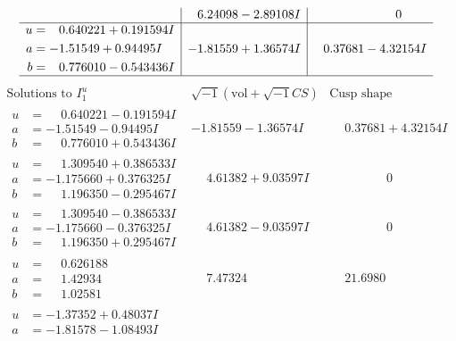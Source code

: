 \documentclass[1p]{elsarticle_modified}
\theoremstyle{definition}
\newcommand{\I}{\sqrt{-1}}
\begin{document}
$$\begin{array}{c|c|c}
 & \phantom{-}6.24098 - 2.89108 I & \phantom{-0.000000 } 0 \\ \hline\begin{aligned}
u &= \phantom{-}0.640221 + 0.191594 I \\
a &= -1.51549 + 0.94495 I \\
b &= \phantom{-}0.776010 - 0.543436 I\end{aligned}
 & -1.81559 + 1.36574 I & \phantom{-}0.37681 - 4.32154 I\\
 \hline 
 \end{array}$$\newpage$$\begin{array}{c|c|c}  
\text{Solutions to }I^u_{1}& \I (\text{vol} + \sqrt{-1}CS) & \text{Cusp shape}\\
 \hline 
\begin{aligned}
u &= \phantom{-}0.640221 - 0.191594 I \\
a &= -1.51549 - 0.94495 I \\
b &= \phantom{-}0.776010 + 0.543436 I\end{aligned}
 & -1.81559 - 1.36574 I & \phantom{-}0.37681 + 4.32154 I \\ \hline\begin{aligned}
u &= \phantom{-}1.309540 + 0.386533 I \\
a &= -1.175660 + 0.376325 I \\
b &= \phantom{-}1.196350 - 0.295467 I\end{aligned}
 & \phantom{-}4.61382 + 9.03597 I & \phantom{-0.000000 } 0 \\ \hline\begin{aligned}
u &= \phantom{-}1.309540 - 0.386533 I \\
a &= -1.175660 - 0.376325 I \\
b &= \phantom{-}1.196350 + 0.295467 I\end{aligned}
 & \phantom{-}4.61382 - 9.03597 I & \phantom{-0.000000 } 0 \\ \hline\begin{aligned}
u &= \phantom{-}0.626188\phantom{ +0.000000I} \\
a &= \phantom{-}1.42934\phantom{ +0.000000I} \\
b &= \phantom{-}1.02581\phantom{ +0.000000I}\end{aligned}
 & \phantom{-}7.47324\phantom{ +0.000000I} & \phantom{-}21.6980\phantom{ +0.000000I} \\ \hline\begin{aligned}
u &= -1.37352 + 0.48037 I \\
a &= -1.81578 - 1.08493 I \\

\end{aligned}
\end{array}$$
\end{document}
